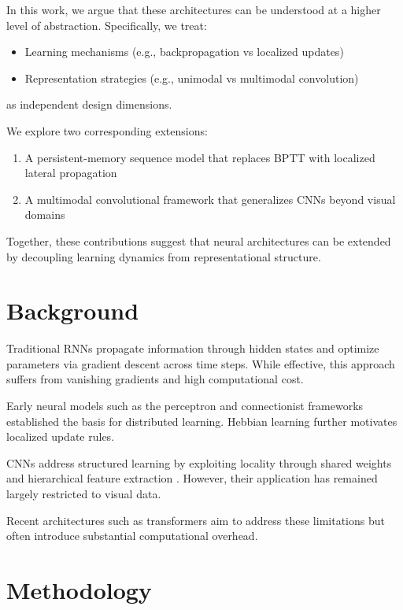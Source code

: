 \documentclass{article}
\begin{document}
	In this work, we argue that these architectures can be understood at a higher level of abstraction. Specifically, we treat:
	
	\begin{itemize}
		\item Learning mechanisms (e.g., backpropagation vs localized updates)
		\item Representation strategies (e.g., unimodal vs multimodal convolution)
	\end{itemize}
	
	as independent design dimensions.
	
	We explore two corresponding extensions:
	
	\begin{enumerate}
		\item A persistent-memory sequence model that replaces BPTT with localized lateral propagation
		\item A multimodal convolutional framework that generalizes CNNs beyond visual domains
	\end{enumerate}
	
	Together, these contributions suggest that neural architectures can be extended by decoupling learning dynamics from representational structure.
	
	\section{Background}
	
	Traditional RNNs propagate information through hidden states and optimize parameters via gradient descent across time steps. While effective, this approach suffers from vanishing gradients and high computational cost.
	
	Early neural models such as the perceptron \cite{rosenblatt1958perceptron} and connectionist frameworks \cite{rumelhart1986pdp} established the basis for distributed learning. Hebbian learning \cite{hebb1949organization} further motivates localized update rules.
	
	CNNs address structured learning by exploiting locality through shared weights and hierarchical feature extraction \cite{lecun1998gradient}. However, their application has remained largely restricted to visual data.
	
	Recent architectures such as transformers aim to address these limitations but often introduce substantial computational overhead.
	
	\section{Methodology}
	
\end{document}
